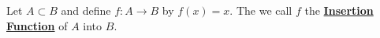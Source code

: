 \newcommand{\InsertionFunction}[0]{\textbf{\hyperref[def:InsertionFunction]{Insertion Function}}\xspace}
\newcommand{\InsertionFunctions}[0]{\textbf{\hyperref[def:InsertionFunction]{Insertion Functions}}\xspace}
\begin{df}
\label{def:InsertionFunction}

\rm
    Let $A \subset B$ and define 
    $f:A \to B$ by $f(x)=x$. 
    The we call $f$ the 
    \InsertionFunction of $A$ into $B$. 
\end{df}

